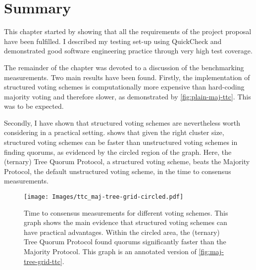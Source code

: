 \documentclass[12pt,chapterprefix=true,toc=bibliography,numbers=noendperiod,
               footnotes=multiple,twoside]{scrreprt}
\begin{document}


\section{Summary}

This chapter started by showing that all the requirements of the project proposal have been fulfilled. I described my testing set-up using QuickCheck and demonstrated good software engineering practice through very high test coverage.

The remainder of the chapter was devoted to a discussion of the benchmarking measurements. Two main results have been found. Firstly, the implementation of structured voting schemes is computationally more expensive than hard-coding majority voting and therefore slower, as demonstrated by \cref{fig:plain-maj-ttc}. This was to be expected.

Secondly, I have shown that structured voting schemes are nevertheless worth considering in a practical setting.  shows that given the right cluster size, structured voting schemes can be faster than unstructured voting schemes in finding quorums, as evidenced by the circled region of the graph. Here, the (ternary) Tree Quorum Protocol, a structured voting scheme, beats the Majority Protocol, the default unstructured voting scheme, in the time to consensus measurements.

\begin{figure}
    \centering
    \texttt{[image: Images/ttc\_maj-tree-grid-circled.pdf]}
    \caption{Time to consensus measurements for different voting schemes. This graph shows the main evidence that structured voting schemes can have practical advantages. Within the circled area, the (ternary) Tree Quorum Protocol found quorums significantly faster than the Majority Protocol. This graph is an annotated version of \cref{fig:maj-tree-grid-ttc}.}
    \label{fig:maj-tree-grid-ttc-circled}
\end{figure}
\end{document}
